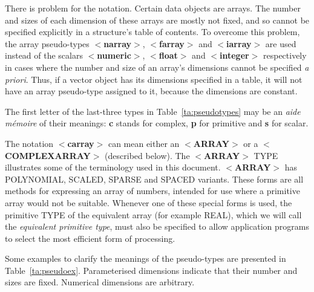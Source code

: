 \documentclass[twoside,11pt]{article}
\renewcommand{\_}{\texttt{\symbol{95}}}
\begin{document}
There is problem for the notation.
Certain data objects are arrays. The number and sizes of each dimension
of these arrays are mostly not fixed, and so cannot be specified explicitly
in a structure's table of contents.
To overcome this problem, the array pseudo-types
$<${\bf narray}$>$, $<${\bf farray}$>$
and $<${\bf iarray}$>$ are used instead of the scalars
$<${\bf numeric}$>$, $<${\bf float}$>$ and $<${\bf integer}$>$ respectively
in cases where the number and size of an array's dimensions cannot be
specified {\it a priori}.
Thus, if a vector object has its dimensions specified in a table,
it will not have an array pseudo-type assigned to it, because the
dimensions are constant.

The first letter of the last-three types in Table~\ref{ta:pseudotypes}
may be an {\it aide m\'{e}moire} of their meanings: {\bf c} stands for
complex, {\bf p} for primitive and {\bf s} for scalar.

The notation $<${\bf c\_array}$>$ can mean either an $<${\bf ARRAY}$>$ or a
$<${\bf COMPLEX\_ARRAY}$>$ (described below). The \mbox{$<${\bf ARRAY}$>$} TYPE
illustrates some of the terminology used in this document.
\mbox{$<${\bf ARRAY}$>$} has
POLYNOMIAL, SCALED, SPARSE and SPACED variants.
These forms are all methods for expressing an array of numbers, intended
for use where a primitive array
would not be suitable.  Whenever one of
these special forms is used, the primitive TYPE of the
equivalent array (for example \_REAL), which we will call the
{\it equivalent primitive type}, must also
be specified to allow application programs to select the
most efficient form of processing.

Some examples to clarify the meanings of the pseudo-types are presented
in Table~\ref{ta:pseudoex}.
Parameterised dimensions indicate that their number and sizes are
fixed. Numerical dimensions are arbitrary.
\end{document}

